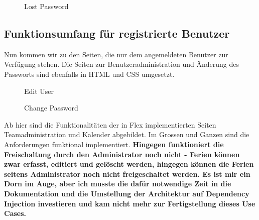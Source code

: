  \begin{figure}[H]
  	\centering
        	\caption{Lost Password}
\end{figure}

\subsection{Funktionsumfang f\"ur registrierte Benutzer}
Nun kommen wir zu den Seiten, die nur dem angemeldeten Benutzer zur Verf\"ugung stehen. Die Seiten zur Benutzeradministration und \"Anderung des Passworts sind ebenfalls in HTML und CSS umgesetzt.

 \begin{figure}[H]
  	\centering
        	\caption{Edit User}
\end{figure}

 \begin{figure}[H]
  	\centering
        	\caption{Change Password}
\end{figure}

Ab hier sind die Funktionalit\"aten der in Flex implementierten Seiten Teamadministration und Kalender abgebildet. Im Grossen und Ganzen sind die Anforderungen funktional implementiert. \textbf{Hingegen funktioniert die Freischaltung durch den Administrator noch nicht - Ferien k\"onnen zwar erfasst, editiert und gel\"oscht werden, hingegen k\"onnen die Ferien seitens Administrator noch nicht freigeschaltet werden. Es ist mir ein Dorn im Auge, aber ich musste die daf\"ur notwendige Zeit in die Dokumentation und die Umstellung der Architektur auf Dependency Injection investieren und kam nicht mehr zur Fertigstellung dieses Use Cases. }

